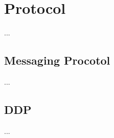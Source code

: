 \section{Protocol}
\label{sec:protocol}

...

\subsection{Messaging Procotol}

...

\subsection{DDP}

...

